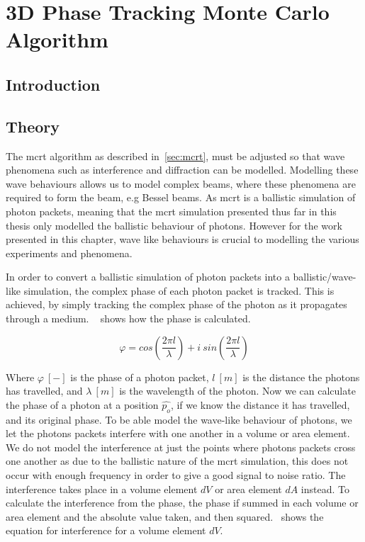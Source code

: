 \chapter{3D Phase Tracking Monte Carlo Algorithm}\label{sec:phase}

\section{Introduction}\label{sec:besintro}

\section{Theory}\label{sec:bestheory}

The \gls{mcrt} algorithm as described in~\cref{sec:mcrt}, must be adjusted so that wave phenomena such as interference and diffraction can be modelled. 
Modelling these wave behaviours allows us to model complex beams, where these phenomena are required to form the beam, e.g Bessel beams. 
As \gls{mcrt} is a ballistic simulation of photon packets, meaning that the \gls{mcrt} simulation presented thus far in this thesis only modelled the ballistic behaviour of photons. 
However for the work presented in this chapter, wave like behaviours is crucial to modelling the various experiments and phenomena.

In order to convert a ballistic simulation of photon packets into a ballistic/wave-like simulation, the complex phase of each photon packet is tracked.
This is achieved, by simply tracking the complex phase of the photon as it propagates through a medium.
~ shows how the phase is calculated.

\begin{equation}
    \varphi = cos\left(\frac{2 \pi l}{\lambda}\right) + i\ sin\left(\frac{2 \pi l}{\lambda}\right)
    \label{eqn:phase}
\end{equation}

Where $\varphi~[-]$ is the phase of a photon packet, $l\ [m]$ is the distance the photons has travelled, and $\lambda~[m]$ is the wavelength of the photon.
Now we can calculate the phase of a photon at a position $\hat{p_o}$, if we know the distance it has travelled, and its original phase. 
To be able model the wave-like behaviour of photons, we let the photons packets interfere with one another in a volume or area element. 
We do not model the interference at just the points where photons packets cross one another as due to the ballistic nature of the \gls{mcrt} simulation, this does not occur with enough frequency in order to give a good signal to noise ratio. 
The interference takes place in a volume element $dV$ or area element $dA$ instead.
To calculate the interference from the phase, the phase if summed in each volume or area element and the absolute value taken, and then squared.~ shows the equation for interference for a volume element $dV$.

